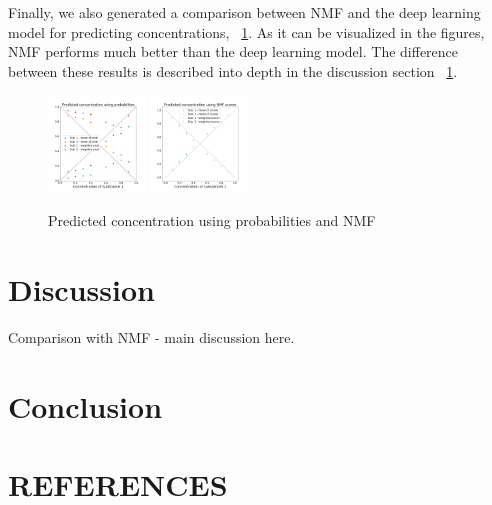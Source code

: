 \documentclass{article}
\begin{document}
Finally, we also generated a comparison between NMF and the deep learning model for predicting concentrations, ~\ref{fig:comparison}. As it can be visualized in the figures, NMF performs much better than the deep learning model. The difference between these results is described into depth in the discussion section ~\ref{sec:discussion}.

\begin{figure}[!h]
	\includegraphics[width=0.23\textwidth]{figures_2/DNN_pred_conc_prob.png}
	\includegraphics[width=0.23\textwidth]{figures_2/nmf_pred_conc.png}
	\caption{Predicted concentration using probabilities and NMF}
	\label{fig:comparison}
\end{figure}


\section{Discussion}
\label{sec:discussion}




Comparison with NMF - main discussion here.

\section{Conclusion}
\label{sec:conclusion}



\vfill
\pagebreak



\section{REFERENCES}
\label{sec:ref}
\end{document}
